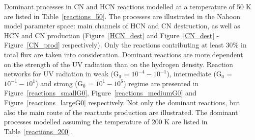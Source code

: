 \documentclass{aa}
\begin{document}
\begin{appendix}
Dominant processes in CN and HCN reactions modelled at a temperature of 50 K are listed in Table~\ref{reactions_50}. The processes are illustrated in the Nahoon model parameter space: main channels of HCN and CN destruction, as well as HCN and CN production (Figure~\ref{HCN_dest} and Figure~\ref{CN_dest} - Figure~\ref{CN_prod} respectively). Only the reactions contributing at least 30\% in total flux are taken into consideration. Dominant reactions are more dependent on the strength of the UV radiation than on the hydrogen density. Reaction networks for UV radiation in weak (G$_0$ = $10^{-4} - 10^{-1}$), intermediate (G$_0$ = $10^{-1} - 10^{1}$) and strong (G$_0$ = $10^{1} - 10^{6}$) regime are presented in Figure~\ref{reactions_smallG0}, Figure~\ref{reactions_mediumG0} and Figure~\ref{reactions_largeG0} respectively. Not only the dominant reactions, but also the main route of the reactants production are illustrated. The dominant processes modelled assuming the temperature of 200 K are listed in Table~\ref{reactions_200}.


\end{appendix}
\end{document}
